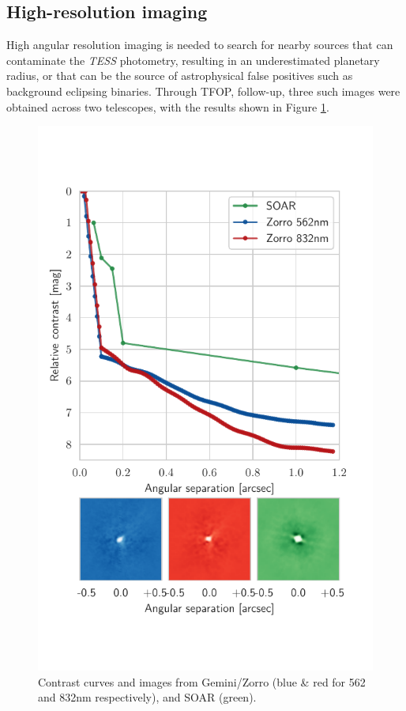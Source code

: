 \documentclass[fleqn,usenatbib]{mnras}
\newcommand{\tess}{{\it TESS}}
\begin{document}
\subsection{High-resolution imaging}
High angular resolution imaging is needed to search for nearby sources that can contaminate the \tess{} photometry, resulting in an underestimated planetary radius, or that can be the source of astrophysical false positives such as background eclipsing binaries. 
Through TFOP, follow-up, three such images were obtained across two telescopes, with the results shown in Figure \ref{fig:imaging}.
\begin{figure}
    \centering
    \includegraphics[width=\columnwidth, trim={0 2cm 0.6cm 1.2cm}]{Imaging}
    \caption{Contrast curves and images from Gemini/Zorro (blue \& red for 562 and 832nm respectively), and SOAR (green).}
    \label{fig:imaging}
\end{figure}
\end{document}
